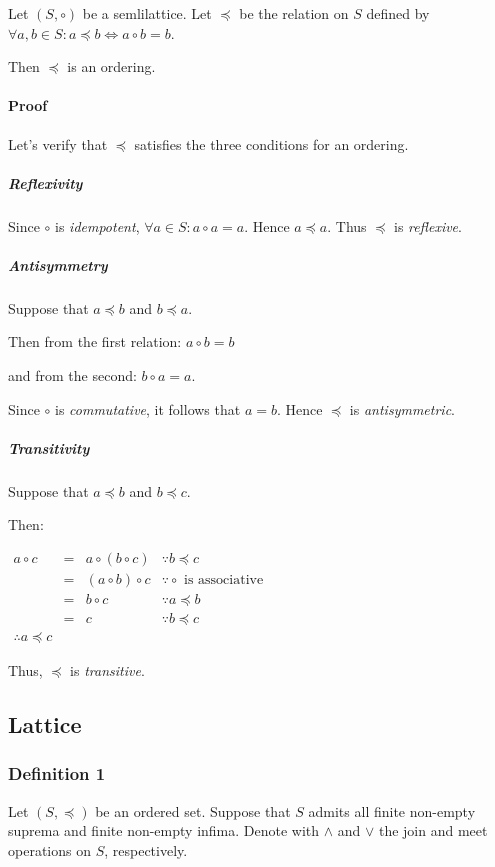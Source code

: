 Let $(S, \circ)$ be a semlilattice. Let $\preceq$ be the relation on
$S$ defined by $\forall a, b \in S: a \preceq b \iff a \circ b = b$.

Then $\preceq$ is an ordering.

\paragraph{Proof}

Let's verify that $\preceq$ satisfies the three conditions for an
ordering.

\subparagraph{Reflexivity}

Since $\circ$ is \textit{idempotent},
$\forall a \in S: a \circ a = a$. Hence $a \preceq a$. Thus $\preceq$
is \textit{reflexive}.

\subparagraph{Antisymmetry}

Suppose that $a \preceq b$ and $b \preceq a$.

Then from the first relation: $a \circ b = b$

and from the second: $b \circ a =a$.

Since $\circ$ is \textit{commutative}, it follows that $a = b$. Hence
$\preceq$ is \textit{antisymmetric}.

\subparagraph{Transitivity}

Suppose that $a \preceq b$ and $b \preceq c$.

Then:

\begin{math}
  \begin{array}{lcll}
    a \circ c & = & a \circ (b \circ c) & \because b \preceq c \\
              & = & (a \circ b) \circ c & \because \circ \text{ is associative} \\
              & = & b \circ c & \because a \preceq b \\
              & = & c & \because b \preceq c \\
    \therefore a \preceq c
  \end{array}
\end{math}

Thus, $\preceq$ is \textit{transitive}.


\subsection{Lattice}

\subsubsection{Definition 1}
Let $(S, \preceq)$ be an ordered set. Suppose that $S$ admits all
finite non-empty suprema and finite non-empty infima. Denote with
$\wedge$ and $\vee$ the join and meet operations on $S$, respectively.

